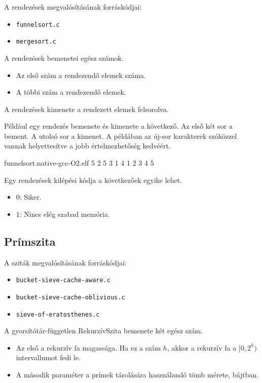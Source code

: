 \documentclass[12pt]{report}
\begin{document}
A rendezések megvalósításának forráskódjai:
\begin{itemize}
\item \texttt{funnelsort.c}
\item \texttt{mergesort.c}
\end{itemize}

A rendezések bemenetei egész számok.
\begin{itemize}
\item Az első szám a rendezendő elemek száma.
\item A többi szám a rendezendő elemek.
\end{itemize}
A rendezések kimenete a rendezett elemek felsorolva.


Például egy rendezés bemenete és kimenete a következő.
Az első két sor a bement. A utolsó sor a kimenet.
A példában az új-sor karakterek szóközzel vannak helyettesítve
a jobb értelmezhetőség kedvéért.
\begin{table}[ht]
\centering
\caption{A rendezés futtatásának példája}
\label{table-sort-example-run}
\begin{boxedverbatim}
funnelsort.native-gcc-O2.elf 
5
2 5 3 1 4
1 2 3 4 5
\end{boxedverbatim}
\end{table}

Egy rendezések kilépési kódja a következőek egyike lehet.
\begin{itemize}
\item $0$: Siker.
\item $1$: Nincs elég szabad memória.
\end{itemize}

\subsection{Prímszita}

A sziták megvalósításának forráskódjai:
\begin{itemize}
\item \texttt{bucket-sieve-cache-aware.c}
\item \texttt{bucket-sieve-cache-oblivious.c}
\item \texttt{sieve-of-eratosthenes.c}
\end{itemize}

A gyorsítótár-független RekurzívSzita bemenete két egész szám.
\begin{itemize}
\item Az első a rekurzív fa magassága.
Ha ez a szám $h$,
akkor a rekurzív fa a $[0, 2^h)$ intervallumot fedi le.
\item A második paraméter a prímek tárolására használandó tömb mérete, bájtban.
\end{itemize}
\end{document}
